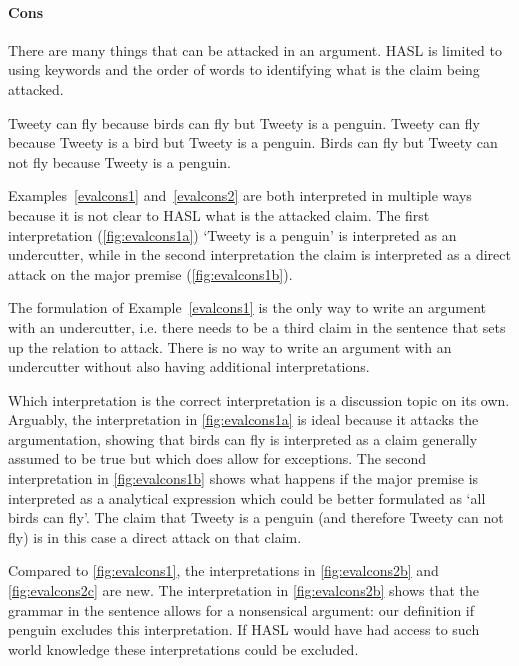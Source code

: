 \paragraph{Cons}
There are many things that can be attacked in an argument. HASL is limited to using keywords and the order of words to identifying what is the claim being attacked.

\begin{exe}
	\ex\label{evalcons1} Tweety can fly because birds can fly but Tweety is a penguin.
	\ex\label{evalcons2} Tweety can fly because Tweety is a bird but Tweety is a penguin.
	\ex\label{evalcons3} Birds can fly but Tweety can not fly because Tweety is a penguin.
\end{exe}

\noindent Examples~\ref{evalcons1} and~\ref{evalcons2} are both interpreted in multiple ways because it is not clear to HASL what is the attacked claim. The first interpretation (\autoref{fig:evalcons1a}) `Tweety is a penguin' is interpreted as an undercutter, while in the second interpretation the claim is interpreted as a direct attack on the major premise (\autoref{fig:evalcons1b}).

The formulation of Example~\ref{evalcons1} is the only way to write an argument with an undercutter, i.e. there needs to be a third claim in the sentence that sets up the relation to attack. There is no way to write an argument with an undercutter without also having additional interpretations.

Which interpretation is the correct interpretation is a discussion topic on its own. Arguably, the interpretation in \autoref{fig:evalcons1a} is ideal because it attacks the argumentation, showing that birds can fly is interpreted as a claim generally assumed to be true but which does allow for exceptions. The second interpretation in \autoref{fig:evalcons1b} shows what happens if the major premise is interpreted as a analytical expression which could be better formulated as `all birds can fly'. The claim that Tweety is a penguin (and therefore Tweety can not fly) is in this case a direct attack on that claim.

Compared to \autoref{fig:evalcons1}, the interpretations in \autoref{fig:evalcons2b} and \autoref{fig:evalcons2c} are new. The interpretation in \autoref{fig:evalcons2b} shows that the grammar in the sentence allows for a nonsensical argument: our definition if penguin excludes this interpretation. If HASL would have had access to such world knowledge these interpretations could be excluded.

